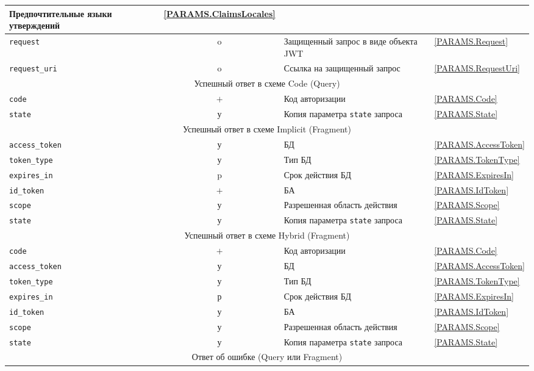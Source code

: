 \begin{table}[p]
\begin{tabular}{|l|c|p{9.0cm}|l|}
Предпочтительные языки утверждений & 
\ref{PARAMS.ClaimsLocales}\\
\hline
%
\lstinline!request! & o & 
Защищенный запрос в виде объекта JWT & 
\ref{PARAMS.Request}\\
\hline
%
\lstinline!request_uri! & o & 
Ссылка на защищенный запрос & 
\ref{PARAMS.RequestUri}\\
\hline
%
\hline
\multicolumn{4}{|c|}{Успешный ответ в схеме Code (Query)}\\ 
\hline
\hline
%
\lstinline!code! & $+$ & 
Код авторизации & 
\ref{PARAMS.Code}\\
\hline
%
\lstinline!state! & у & 
Копия параметра \lstinline!state! запроса &  
\ref{PARAMS.State}\\
\hline
%
\hline
\multicolumn{4}{|c|}{Успешный ответ в схеме Implicit (Fragment)}\\
\hline
\hline
%
\lstinline!access_token! & у & 
БД & 
\ref{PARAMS.AccessToken}\\
\hline
%
\lstinline!token_type! & у & 
Тип БД &
\ref{PARAMS.TokenType}\\
\hline
%
\lstinline!expires_in! & p & 
Срок действия БД &
\ref{PARAMS.ExpiresIn}\\
\hline
%
\lstinline!id_token! & $+$ & 
БА &
\ref{PARAMS.IdToken}\\
\hline
%
\lstinline!scope! & у & 
Разрешенная область действия & 
\ref{PARAMS.Scope}\\
\hline
%
\lstinline!state! & у & 
Копия параметра \lstinline!state! запроса &  
\ref{PARAMS.State}\\
\hline
%
\hline
\multicolumn{4}{|c|}{Успешный ответ в схеме Hybrid (Fragment)}\\
\hline
\hline
%
\lstinline!code! & $+$ & 
Код авторизации & 
\ref{PARAMS.Code}\\
\hline
%
\lstinline!access_token! & у & 
БД & 
\ref{PARAMS.AccessToken}\\
\hline
%
\lstinline!token_type! & у & 
Тип БД &
\ref{PARAMS.TokenType}\\
\hline
%
\lstinline!expires_in! & р & 
Срок действия БД &
\ref{PARAMS.ExpiresIn}\\
\hline
%
\lstinline!id_token! & у & 
БА &
\ref{PARAMS.IdToken}\\
\hline
%
\lstinline!scope! & у & 
Разрешенная область действия & 
\ref{PARAMS.Scope}\\
\hline
%
\lstinline!state! & у & 
Копия параметра \lstinline!state! запроса &  
\ref{PARAMS.State}\\
\hline
%
\hline
\multicolumn{4}{|c|}{Ответ об ошибке (Query или Fragment)}\\

\end{tabular}
\end{table}
